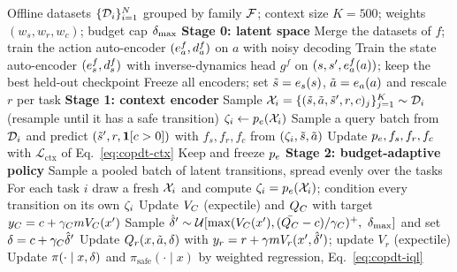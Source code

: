 \begin{algorithm}[t]
\caption{Training: latent space, context encoder and budget-adaptive policy}
\label{alg:copdt-train}
\begin{algorithmic}[1]
\REQUIRE Offline datasets $\{\mathcal{D}_i\}_{i=1}^{N}$ grouped by family $\mathcal{F}$; context size $K{=}500$; weights $(w_s,w_r,w_c)$; budget cap $\delta_{\max}$
\STATE \textbf{Stage 0: latent space}
  \STATE Merge the datasets of $f$; train the action auto-encoder $(e_a^f,d_a^f)$ on $a$ with noisy decoding
  \STATE Train the state auto-encoder $(e_s^f,d_s^f)$ with inverse-dynamics head $g^f$ on $(s,s',e_a^f(a))$; keep the best held-out checkpoint
\ENDFOR
\STATE Freeze all encoders; set $\tilde s=e_s(s)$, $\tilde a=e_a(a)$ and rescale $r$ per task
\STATE \textbf{Stage 1: context encoder}
    \STATE Sample $\mathcal{X}_i=\{(\tilde s,\tilde a,\tilde s',r,c)_j\}_{j=1}^{K}\sim\mathcal{D}_i$ (resample until it has a safe transition)
    \STATE $\zeta_i\leftarrow p_e(\mathcal{X}_i)$
    \STATE Sample a query batch from $\mathcal{D}_i$ and predict $(\tilde s',r,\mathbf{1}[c>0])$ with $f_s,f_r,f_c$ from $(\zeta_i,\tilde s,\tilde a)$
  \ENDFOR
  \STATE Update $p_e,f_s,f_r,f_c$ with $\mathcal{L}_{\mathrm{ctx}}$ of Eq.~\eqref{eq:copdt-ctx}
\ENDWHILE
\STATE Keep and freeze $p_e$
\STATE \textbf{Stage 2: budget-adaptive policy}
  \STATE Sample a pooled batch of latent transitions, spread evenly over the tasks
  \STATE For each task $i$ draw a fresh $\mathcal{X}_i$ and compute $\zeta_i=p_e(\mathcal{X}_i)$; condition every transition on its own $\zeta_i$
  \STATE Update $V_C$ (expectile) and $Q_C$ with target $y_C=c+\gamma_C mV_C(x')$
  \STATE Sample $\hat\bud'\sim\mathcal{U}[\max(\VC(x'),(\bar\QC-c)/\gamma_C)^+,\ \bud_{\max}]$ and set $\delta=c+\gamma_C\hat{\delta}'$
  \STATE Update $Q_r(x,\tilde a,\delta)$ with $y_r=r+\gamma m V_r(x',\hat{\delta}')$; update $V_r$ (expectile)
  \STATE Update $\pi(\cdot\mid x,\delta)$ and $\pi_{\mathrm{safe}}(\cdot\mid x)$ by weighted regression, Eq.~\eqref{eq:copdt-iql}
\ENDWHILE
\end{algorithmic}
\end{algorithm}

